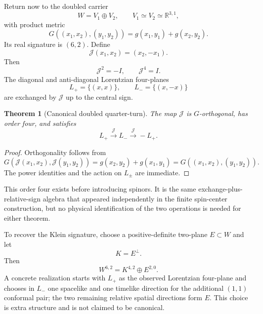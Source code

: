 \documentclass[11pt]{article}
\newtheorem{theorem}{Theorem}[section]
\theoremstyle{definition}\newtheorem{definition}[theorem]{Definition}
\theoremstyle{remark}\newtheorem{remark}[theorem]{Remark}\newtheorem{conjecture}[theorem]{Conjecture}
\begin{document}
Return now to the doubled carrier
\begin{equation}
 W=V_1\oplus V_2,\qquad V_1\simeq V_2\simeq\mathbb R^{3,1},
\end{equation}
with product metric
\begin{equation}
 G((x_1,x_2),(y_1,y_2))=g(x_1,y_1)+g(x_2,y_2).
\end{equation}
Its real signature is $(6,2)$. Define
\begin{equation}\label{eq:J8}
 \mathcal J(x_1,x_2)=(x_2,-x_1).
\end{equation}
Then
\begin{equation}\label{eq:J8powers}
 \boxed{\mathcal J^2=-I,\qquad \mathcal J^4=I.}
\end{equation}
The diagonal and anti-diagonal Lorentzian four-planes
\begin{equation}
 L_+=\{(x,x)\},\qquad L_-=\{(x,-x)\}
\end{equation}
are exchanged by $\mathcal J$ up to the central sign.

\begin{theorem}[Canonical doubled quarter-turn]\label{thm:doubledquarter}
The map $\mathcal J$ is $G$-orthogonal, has order four, and satisfies
\begin{equation}
 L_+\xrightarrow{\mathcal J}L_-\xrightarrow{\mathcal J}-L_+.
\end{equation}
\end{theorem}
\begin{proof}
Orthogonality follows from
\[
G(\mathcal J(x_1,x_2),\mathcal J(y_1,y_2))
=g(x_2,y_2)+g(x_1,y_1)
=G((x_1,x_2),(y_1,y_2)).
\]
The power identities and the action on $L_\pm$ are immediate.
\end{proof}

This order four exists before introducing spinors. It is the same exchange-plus-relative-sign algebra that appeared independently in the finite spin-center construction, but no physical identification of the two operations is needed for either theorem.

To recover the Klein signature, choose a positive-definite two-plane $E\subset W$ and let
\begin{equation}
 K=E^\perp.
\end{equation}
Then
\begin{equation}\label{eq:6242}
 \boxed{W^{6,2}=K^{4,2}\oplus E^{2,0}.}
\end{equation}
A concrete realization starts with $L_+$ as the observed Lorentzian four-plane and chooses in $L_-$ one spacelike and one timelike direction for the additional $(1,1)$ conformal pair; the two remaining relative spatial directions form $E$. This choice is extra structure and is not claimed to be canonical.
\end{document}
